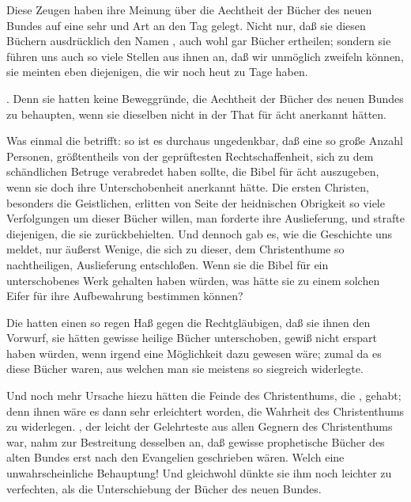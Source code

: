 \begin{aufza}
\begin{aufzb}
\end{aufzb}
\item Diese Zeugen haben ihre Meinung über die Aechtheit der Bücher des neuen Bundes auf eine sehr  und  Art an den Tag gelegt. Nicht nur, daß sie diesen Büchern ausdrücklich den Namen , auch wohl gar  Bücher ertheilen; sondern sie führen uns auch so viele Stellen aus ihnen an, daß wir unmöglich zweifeln können, sie meinten eben diejenigen, die wir noch heut zu Tage haben.
\item {}. Denn sie hatten keine Beweggründe, die Aechtheit der Bücher des neuen Bundes zu behaupten, wenn sie dieselben nicht in der That für ächt anerkannt hätten.
\begin{aufzb}
\item Was einmal die  betrifft: so ist es durchaus ungedenkbar, daß eine so große Anzahl Personen, größtentheils von der geprüftesten Rechtschaffenheit, sich zu dem schändlichen Betruge verabredet haben sollte, die Bibel für ächt auszugeben, wenn sie doch ihre Unterschobenheit anerkannt hätte. Die ersten Christen, besonders die Geistlichen, erlitten von Seite der heidnischen Obrigkeit so viele Verfolgungen um dieser Bücher willen, man forderte ihre Auslieferung, und strafte diejenigen, die sie zurückbehielten. Und dennoch gab es, wie die Geschichte uns meldet, nur äußerst Wenige, die sich zu dieser, dem Christenthume so nachtheiligen, Auslieferung entschloßen. Wenn sie die Bibel für ein unterschobenes Werk gehalten haben würden, was hätte sie zu einem solchen Eifer für ihre Aufbewahrung bestimmen können?
\item Die  hatten einen so regen Haß gegen die Rechtgläubigen, daß sie ihnen den Vorwurf, sie hätten gewisse heilige Bücher unterschoben, gewiß nicht erspart haben würden, wenn irgend eine Möglichkeit dazu gewesen wäre; zumal da es diese Bücher waren, aus welchen man sie meistens so siegreich widerlegte.
\item Und noch mehr Ursache hiezu hätten die Feinde des Christenthums, die , gehabt; denn ihnen wäre es dann sehr erleichtert worden, die Wahrheit des Christenthums zu widerlegen. , der leicht der Gelehrteste aus allen Gegnern des Christenthums war, nahm zur Bestreitung desselben an, daß gewisse prophetische Bücher des alten Bundes erst nach den Evangelien geschrieben wären. Welch eine unwahrscheinliche Behauptung! Und gleichwohl dünkte sie ihm noch leichter zu verfechten, als die Unterschiebung der Bücher des neuen Bundes.
\end{aufzb}
\end{aufza}

